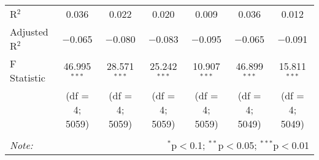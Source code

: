 \begin{tabular}{@{\extracolsep{5pt}}lcccccc}
R$^{2}$ & 0.036 & 0.022 & 0.020 & 0.009 & 0.036 & 0.012 \\ 
Adjusted R$^{2}$ & $-$0.065 & $-$0.080 & $-$0.083 & $-$0.095 & $-$0.065 & $-$0.091 \\ 
F Statistic & 46.995$^{***}$ & 28.571$^{***}$ & 25.242$^{***}$ & 10.907$^{***}$ & 46.899$^{***}$ & 15.811$^{***}$ \\ 
 & (df = 4; 5059) & (df = 4; 5059) & (df = 4; 5059) & (df = 4; 5059) & (df = 4; 5049) & (df = 4; 5049) \\ 
\hline 
\hline \\[-1.8ex] 
\textit{Note:}  & \multicolumn{6}{r}{$^{*}$p$<$0.1; $^{**}$p$<$0.05; $^{***}$p$<$0.01} \\ 
\end{tabular} 
